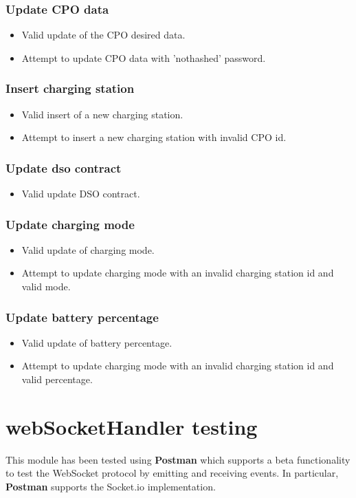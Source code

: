 \subsubsection{Update CPO data}
\begin{itemize}
    \item Valid update of the CPO desired data.
    \item Attempt to update CPO data with 'nothashed' password.
\end{itemize}
\subsubsection{Insert charging station}
\begin{itemize}
    \item Valid insert of a new charging station.
    \item Attempt to insert a new charging station with invalid CPO id.
\end{itemize}
\subsubsection{Update dso contract}
\begin{itemize}
    \item Valid update DSO contract.
\end{itemize}
\subsubsection{Update charging mode}
\begin{itemize}
    \item Valid update of charging mode.
    \item Attempt to update charging mode with an invalid charging station id and valid mode.
\end{itemize}
\subsubsection{Update battery percentage}
\begin{itemize}
    \item Valid update of battery percentage.
    \item Attempt to update charging mode with an invalid charging station id and valid percentage.
\end{itemize}
\section{webSocketHandler testing}
This module has been tested using \textbf{Postman} which supports a beta functionality to test the WebSocket protocol by emitting and receiving events. In particular, \textbf{Postman} supports the Socket.io implementation.